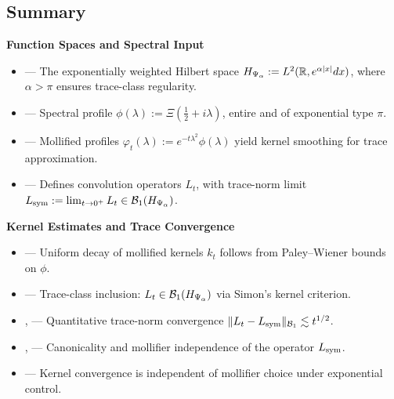\subsection*{Summary}
\label{sec:operator_construction_summary}

\textbf{Function Spaces and Spectral Input}
\begin{itemize}
  \item {} — The exponentially weighted Hilbert space \( H_{\Psi_\alpha} := L^2(\mathbb{R}, e^{\alpha |x|} dx) \), where \( \alpha > \pi \) ensures trace-class regularity.
  \item {} — Spectral profile \( \phi(\lambda) := \Xi(\tfrac{1}{2} + i\lambda) \), entire and of exponential type \( \pi \).
  \item {} — Mollified profiles \( \varphi_t(\lambda) := e^{-t\lambda^2} \phi(\lambda) \) yield kernel smoothing for trace approximation.
  \item {} — Defines convolution operators \( L_t \), with trace-norm limit \( L_{\mathrm{sym}} := \lim_{t \to 0^+} L_t \in \mathcal{B}_1(H_{\Psi_\alpha}) \).
\end{itemize}

\textbf{Kernel Estimates and Trace Convergence}
\begin{itemize}
  \item {} — Uniform decay of mollified kernels \( k_t \) follows from Paley–Wiener bounds on \( \phi \).
  \item {} — Trace-class inclusion: \( L_t \in \mathcal{B}_1(H_{\Psi_\alpha}) \) via Simon’s kernel criterion.
  \item {},  — Quantitative trace-norm convergence \( \|L_t - L_{\mathrm{sym}}\|_{\mathcal{B}_1} \lesssim t^{1/2} \).
  \item {},  — Canonicality and mollifier independence of the operator \( L_{\mathrm{sym}} \).
  \item {} — Kernel convergence is independent of mollifier choice under exponential control.
\end{itemize}

